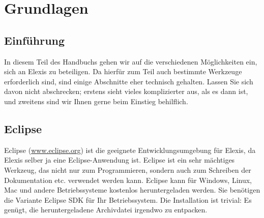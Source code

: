 %

\chapter{Grundlagen}
\section{Einführung}
In diesem Teil des Handbuchs gehen wir auf die verschiedenen Möglichkeiten ein,
sich an Elexis zu beteiligen. Da hierfür zum Teil auch bestimmte Werkzeuge
erforderlich sind, sind einige Abschnitte eher technisch gehalten. Lassen Sie
sich davon nicht abschrecken; erstens sieht vieles komplizierter aus, als es
dann ist, und zweitens sind wir Ihnen gerne beim Einstieg behilflich.
\section{Eclipse}
\label{Eclipse}
Eclipse (\href{http://www.eclipse.org}{www.eclipse.org})  ist die
geeignete Entwicklungsumgebung für Elexis, da Elexis selber ja eine
Eclipse-Anwendung ist.
Eclipse ist ein sehr mächtiges Werkzeug, das nicht nur zum Programmieren,
sondern auch zum Schreiben der Dokumentation etc. verwendet werden kann. Eclipse
kann für Windows, Linux, Mac und andere Betriebssysteme kostenlos heruntergeladen
werden. Sie benötigen die Variante \glqq Eclipse SDK\grqq{} für Ihr
Betriebssystem. Die Installation ist trivial: Es genügt, die heruntergeladene
Archivdatei irgendwo zu entpacken.
